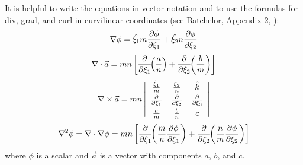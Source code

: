 It is helpful to write the equations in vector notation and to use
the formulas for div, grad, and curl in curvilinear coordinates (see
Batchelor, Appendix 2, \cite{Batchelor}):
\begin{equation}
   \nabla \phi = \hat{\xi_1} m {\partial \phi \over \partial \xi_1} +
                 \hat{\xi_2} n {\partial \phi \over \partial \xi_2}
\end{equation}
\begin{equation}
   \nabla \cdot \vec{a} = mn \left[
   {\partial \over \partial \xi_1} \!\! \left( {a \over n} \right) +
   {\partial \over \partial \xi_2} \!\! \left( {b \over m} \right)
   \right]
\end{equation}
\begin{equation}
   \nabla \times \vec{a} = mn \left| \begin{array}{ccc}
   \vspace{1 mm}
   {\hat{\xi}_1 \over m} & {\hat{\xi}_2 \over n} & \hat{k} \\
   \vspace{1 mm}
   {\partial \over \partial \xi_1} &
   {\partial \over \partial \xi_2} &
   {\partial \over \partial \xi_3} \\
   {a \over m} & {b \over n} & c
   \end{array} \right|
\end{equation}
\begin{equation}
   \nabla^2 \phi = \nabla \cdot \nabla \phi = mn \left[ 
   {\partial \over \partial \xi_1} \!\! \left( {m \over n} 
   {\partial \phi \over \partial \xi_1} \right) +
   {\partial \over \partial \xi_2} \!\! \left( {n \over m} 
   {\partial \phi \over \partial \xi_2} \right) \right]
\end{equation}
where $\phi$ is a scalar and $\vec{a}$ is a vector with components
$a$, $b$, and $c$.

